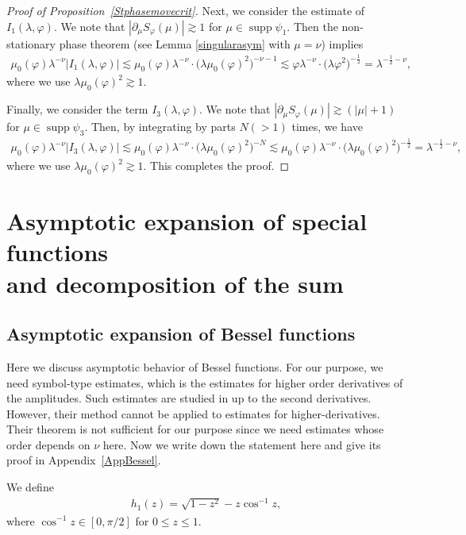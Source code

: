 \documentclass[10pt,a4paper]{article}
\numberwithin{equation}{section}
\DeclareMathOperator{\supp}{supp}%
\def\f{\varphi}
\def\g{\psi}
\def\l{\lambda}
\def\m{\mu}
\def\n{\nu}
\def\pa{\partial}
\begin{document}
\begin{proof}[Proof of Proposition~\ref{Stphasemovecrit}]
Next, we consider the estimate of $I_{1}(\l,\f)$. We note that $|\pa_{\m}S_{\f}(\m)|\gtrsim 1$ for $\m\in \supp \g_1$.
Then the non-stationary phase theorem (see Lemma \ref{singularasym} with $\m=\n$) implies
\begin{align*}
\m_0(\f)\l^{-\n}|I_1(\l,\f)|\lesssim \m_0(\f)\l^{-\n}\cdot \bigl(\l \m_0(\f)^2\bigr)^{-\n-1}\lesssim \f\l^{-\n}\cdot \bigl(\l \f^2\bigr)^{-\frac{1}{2}}=\l^{-\frac{1}{2}-\n},
\end{align*}
where we use $\l \m_0(\f)^2\gtrsim 1$.

Finally, we consider the term $I_{3}(\l,\f)$. We note that $|\pa_{\m}S_{\f}(\m)|\gtrsim (|\m|+1)$ for $\m\in \supp \g_3$. Then, by integrating by parts $N(>1)$ times, we have
\begin{align*}
\m_0(\f)\l^{-\n}|I_3(\l,\f)|\lesssim \m_0(\f)\l^{-\n}\cdot \bigl(\l \m_0(\f)^2\bigr)^{-N}\lesssim \m_0(\f)\l^{-\n}\cdot \bigl(\l \m_0(\f)^2\bigr)^{-\frac{1}{2}}=\l^{-\frac{1}{2}-\n},
\end{align*}
where we use $\l \m_0(\f)^2\gtrsim 1$. This completes the proof.
\end{proof}

\section[Asymptotic expansion of special functions and decomposition of the sum]{Asymptotic expansion of special functions\\ and decomposition of the sum}

\subsection{Asymptotic expansion of Bessel functions}


Here we discuss asymptotic behavior of Bessel functions. For our purpose, we need symbol-type estimates, which is the estimates for higher order derivatives of the amplitudes. Such estimates are studied in \cite[Theorem 9.1]{IJ} up to the second derivatives. However, their method cannot be applied to estimates for higher-derivatives. Their theorem is not sufficient for our purpose since we need estimates whose order depends on $\n$ here.
Now we write down the statement here and give its proof in Appendix~\ref{AppBessel}.

We define
\begin{align}\label{hdef}
h_1(z)=\sqrt{1-z^2}-z\cos^{-1} z,
\end{align}
where $\cos^{-1} z\in [0,\pi/2]$ for $0\leq z\leq 1$.
\end{document}
